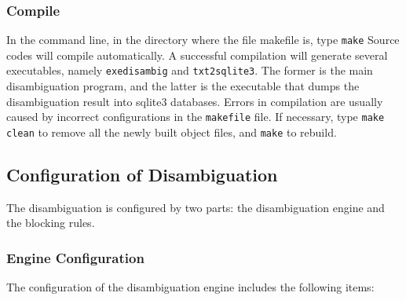 \documentclass{article}
\begin{document}
\subsubsection{Compile}

In the command line, in the directory where the 
file makefile is, type \texttt{make}
Source codes will compile automatically. A successful 
compilation will generate several executables, namely
\texttt{exedisambig} and \texttt{txt2sqlite3}.
The former is the main disambiguation program, and the 
latter is the executable that dumps the disambiguation 
result into sqlite3 databases. Errors in compilation are 
usually caused by incorrect configurations in 
the \texttt{makefile} file. If necessary, type 
\texttt{make clean} to remove all the newly built 
object files, and \texttt{make} to rebuild.


\subsection{Configuration of Disambiguation}

The disambiguation is configured by two parts: 
the disambiguation engine and the blocking rules.


\subsubsection{Engine Configuration}

The configuration of the disambiguation engine
includes the following items:
\end{document}
